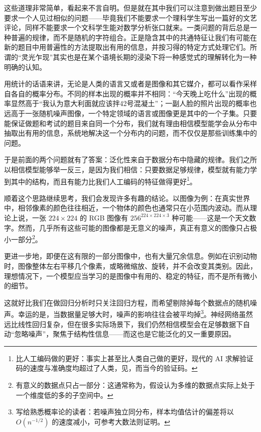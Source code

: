 这些道理非常简单，看起来不言自明。但是就在其中我们可以注意到做出题目至少要求一个人见过相似的问题——毕竟我们不能要求一个理科学生写出一篇好的文艺评论，同样不能要求一个文科学生能对数学分析张口就来。一类问题的背后总是一种普遍的规律，而不是随机的字符组合。正是隐含其中的共通特征让我们有可能在新的题目中用普遍性的方法提取出有用的信息，并按习得的特定方式处理它们。所谓的“灵光乍现”其实也是在某个语境长期的浸染下将一种感觉式的理解转化为一种明确的认知。

用统计的话语来讲，无论是人类的语言又或者是图像和其它媒介，都可以看作采样自各自的概率分布。不同的样本出现的概率并不相同：“今天晚上吃什么”出现的概率显然高于“我认为意大利面就应该拌42号混凝土”；一副人脸的照片出现的概率也远高于一张随机噪声图像，一个特定领域的语言或图像更是其中的一个子集。只要能保证做题和考试的题目来自同一个分布，我们就有理由相信模型能学会从分布中抽取出有用的信息，系统地解决这一个分布内的问题，而不仅仅是那些训练集中的问题。

于是前面的两个问题就有了答案：泛化性来自于数据分布中隐藏的规律。我们之所以相信模型能够举一反三，是因为我们相信：只要数据足够规律，模型就有能力学到其中的结构，而且有能力比我们人工编码的特征做得更好\footnote{比人工编码做的更好：事实上甚至比人类自己做的更好，现代的 AI 求解验证码的速度与准确度均超过了人类，见，而当今的验证码。}。

顺着这个思路继续思考，我们会发现许多有趣的结论。以图像为例：在真实世界中，相邻像素的颜色往往相近，一个物体的颜色也通常只在小范围内波动。而从理论上说，一张 $224 \times 224$ 的 RGB 图像有 $256^{224 \times 224 \times 3}$ 种可能——这是一个天文数字。然而，几乎所有这些可能的图像都是无意义的噪声，真正有意义的图像只占极小一部分\footnote{有意义的数据点只占一部分：这通常称为，假设认为多维的数据点实际上处于一个维度低的多的子空间中。}。

更进一步地，即便在这有限的一部分图像中，也有大量冗余信息。例如在识别动物时，图像整体左右平移几个像素，或略微缩放、旋转，并不会改变其类别。因此，理想情况下，一个模型应当学习的是图像中有用的、稳定的特征，而不是所有微小的细节。

这就好比我们在做回归分析时只关注回归方程，而希望剔除掉每个数据点的随机噪声。幸运的是，当数据量足够大时，噪声的影响往往会被平均掉\footnote{写给熟悉概率论的读者：若噪声独立同分布，样本均值估计的偏差将以 $O(n^{-1/2})$ 的速度减小，可参考大数法则证明。}。神经网络虽然远比线性回归复杂，但在很多实际场景下，我们仍然相信模型会在足够数据下自动“忽略噪声”，聚焦于结构性信息——而这也是它能泛化的又一重要原因。

